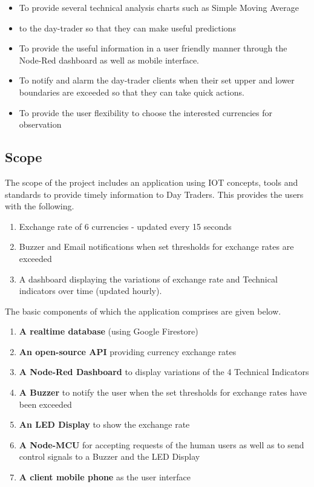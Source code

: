 \begin{itemize}[itemsep=-1.7mm]

\item To provide several technical analysis charts such as Simple Moving Average \item to the day-trader so that they can make useful predictions
\item To provide the useful information in a user friendly manner through the Node-Red dashboard as well as mobile interface.
\item To notify and alarm the day-trader clients when their set upper and lower boundaries are exceeded so that they can take quick actions.
\item To provide the user flexibility to choose the interested currencies for observation


\end{itemize}


\subsection{Scope}

The scope of the project includes an application using IOT concepts, tools and standards to provide timely information to Day Traders. This provides the users with the following.

\begin{enumerate}[itemsep=-1.7mm]
\item Exchange rate of 6 currencies - updated every 15 seconds
\item Buzzer and Email notifications when set thresholds for exchange rates are exceeded
\item A dashboard displaying the variations of exchange rate and Technical indicators over time (updated hourly).
\end{enumerate}

The basic components of which the application comprises are given below.

\begin{enumerate}[itemsep=-1.7mm]
\item \textbf{A realtime database} (using Google Firestore)
\item \textbf{An open-source API} providing currency exchange rates 
\item \textbf{A Node-Red Dashboard} to display variations of the 4 Technical Indicators
\item \textbf{A Buzzer} to notify the user when the set thresholds for exchange rates have been exceeded
\item \textbf{An LED Display} to show the exchange rate
\item \textbf{A Node-MCU} for accepting requests of the human users as well as to send control signals to a Buzzer and the LED Display
\item \textbf{A client mobile phone} as the user interface
\end{enumerate}


